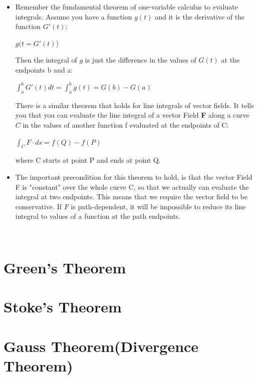 \documentclass[12pt,a4paper]{article}
\begin{document}
	\begin{itemize}
		\item Remember the fundamental theorem of one-variable calculus to evaluate integrals. Assume you have a function $g(t)$ and it is the derivative of the function $G'(t)$:\\
		\begin{center}
			$g(t = G'(t)$)
		\end{center}
		Then the integral of $g$ is just the difference in the values of $G(t)$ at the endpoints b and a:\\
		\begin{center}
			$\int_{a}^{b} G'(t) dt =\int_{a}^{b} g(t) = G(b) - G(a)$
		\end{center}
		There is a similar theorem that holds for line integrals of vector fields. It tells you that you can evaluate the line integral of a vector Field \textbf{F} along a curve $C$ in the values of another function f evaluated at the endpoints of C:\\
		\begin{center}
			$\int_{C}^{}F \cdot ds = f(Q) - f(P)$
		\end{center}
		where C starts at point P and ends at point Q. 
		
		\item The important precondition for this theorem to hold, is that the vector Field F is "constant" over the whole curve C, so that we actually can evaluate the integral at two endpoints. This means that we require the vector field to be conservative. If $F$ is path-dependent, it will be impossible to reduce its line integral to values of a function at the path endpoints. 
		
		\ 
		
	\end{itemize}
	
	\newpage
	
	\section{Green's Theorem}
	
	\newpage
	
	\section{Stoke's Theorem}
	
	\newpage
	
	\section{Gauss Theorem(Divergence Theorem)}
	
	
	

	
	
	

	
\end{document}
